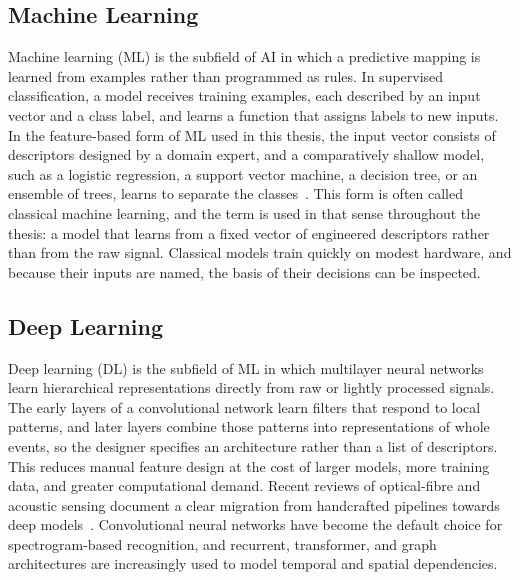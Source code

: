 \subsection{Machine Learning}
\label{sec:chap2MLdef}
Machine learning (ML) is the subfield of AI in which a predictive mapping is learned from examples rather than programmed as rules. In supervised classification, a model receives training examples, each described by an input vector and a class label, and learns a function that assigns labels to new inputs. In the feature-based form of ML used in this thesis, the input vector consists of descriptors designed by a domain expert, and a comparatively shallow model, such as a logistic regression, a support vector machine, a decision tree, or an ensemble of trees, learns to separate the classes~\cite{breiman2001randomforests,cai2018feature}. This form is often called classical machine learning, and the term is used in that sense throughout the thesis: a model that learns from a fixed vector of engineered descriptors rather than from the raw signal. Classical models train quickly on modest hardware, and because their inputs are named, the basis of their decisions can be inspected.

\subsection{Deep Learning}
\label{sec:chap2DL}
Deep learning (DL) is the subfield of ML in which multilayer neural networks learn hierarchical representations directly from raw or lightly processed signals. The early layers of a convolutional network learn filters that respond to local patterns, and later layers combine those patterns into representations of whole events, so the designer specifies an architecture rather than a list of descriptors. This reduces manual feature design at the cost of larger models, more training data, and greater computational demand. Recent reviews of optical-fibre and acoustic sensing document a clear migration from handcrafted pipelines towards deep models~\cite{venketeswaran2022recent,cao2025aireview}. Convolutional neural networks have become the default choice for spectrogram-based recognition, and recurrent, transformer, and graph architectures are increasingly used to model temporal and spatial dependencies.

